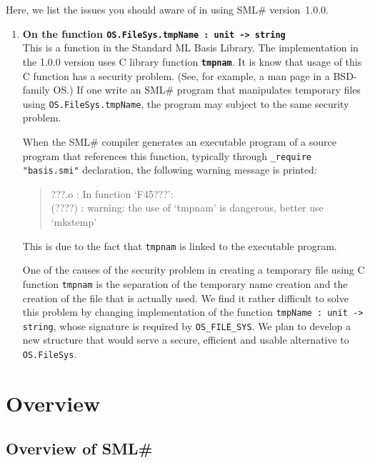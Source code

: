 \documentclass{jbook}
\newcommand{\txt}[2]{#2}
\newcommand{\smlsharp}{SML\#}
\newcommand{\version}{1.0.0}
\newenvironment{program}{\begin{tt}\begin{quote}}{\end{quote}\end{tt}}
\begin{document}
Here, we list the issues you should aware of in using \smlsharp{}
version~\version{}.
\begin{enumerate}
\item  {\bf On the function {\tt OS.FileSys.tmpName : unit -> string}}\\
	This is a function in the Standard ML Basis Library.
	The implementation in the \version{} version uses C library
function {\bf\tt tmpnam}.
	It is know that usage of this C function has a security problem.
	(See, for example, a man page in a BSD-family OS.)
	If one write an \smlsharp{} program that manipulates
temporary files using {\tt OS.FileSys.tmpName}, the program may subject
to the same security problem.
  
	When the \smlsharp{} compiler generates an executable program
of a source program that references this function, typically through
{\tt \_require "basis.smi"} declaration, the following warning message
is printed:
\begin{program}
???.o : In function `F45???':\\
(????) : warning: the use of `tmpnam' is dangerous, better use `mkstemp'
\end{program}      
	This is due to the fact that {\tt tmpnam} is linked to the
executable program.
  
	One of the causes of the security problem in creating a
temporary file using C function {\tt tmpnam} is the separation 
of the temporary name creation and the creation of the file that is
actually used.
	We find it rather difficult to solve this problem by changing 
implementation of the function {\tt tmpName : unit -> string}, whose
signature is required by {\tt OS\_FILE\_SYS}.
	We plan to develop a new structure that would serve
a secure, efficient and usable alternative to {\tt OS.FileSys}.
\end{enumerate}
\fi%

\tableofcontents
\mainmatter

\part{\txt{概要}{Overview}}
\label{part:outline}

\chapter{\txt{\smlsharp{}の概要}{Overview of \smlsharp{}}}
\label{chap:intro}
\end{document}

